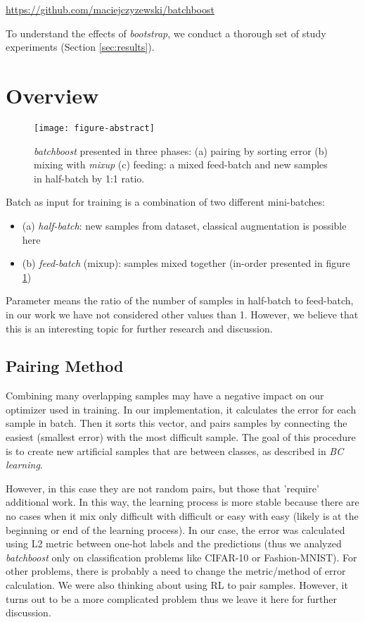 \documentclass{article}
\begin{document}
\begin{center}
\url{https://github.com/maciejczyzewski/batchboost}
\end{center}

To understand the effects of \emph{bootstrap}, we conduct a
thorough set of study experiments (Section \ref{sec:results}).

\section{Overview}
\label{sec:overview}

\begin{figure}[H]
  \centering
  \texttt{[image: figure-abstract]}
  \caption{\emph{batchboost} presented in three phases: (a) pairing by sorting
	  error (b) mixing with \emph{mixup} (c) feeding: a mixed feed-batch and new
	  samples in half-batch by 1:1 ratio.}
  \label{fig:abstract}
\end{figure}

Batch as input for training is a combination of two different mini-batches:
\begin{itemize}
\item (a) \emph{half-batch}: new samples from dataset, classical augmentation is possible here
\item (b) \emph{feed-batch} (mixup): samples mixed together (in-order presented in
figure \ref{fig:abstract})
\end{itemize}

Parameter  means the ratio of the number of samples in half-batch to
feed-batch, in our work we have not considered other values than 1. However, we believe that this is an interesting topic for further research and discussion.

\subsection{Pairing Method}
\label{sec:pairing}

Combining many overlapping samples may have a negative impact on our optimizer
used in training.  In our implementation, it calculates the error for each
sample in batch.  Then it sorts this vector, and pairs samples by connecting the
easiest (smallest error) with the most difficult sample.  The goal of this
procedure is to create new artificial samples that are between classes, as
described in \emph{BC learning}.

However, in this case they are not random pairs, but those that 'require'
additional work. In this way, the learning process is more stable because there
are no cases when it mix only difficult with difficult or easy with easy (likely
is at the beginning or end of the learning process).
In our case, the error was calculated using L2 metric between one-hot labels and
the predictions (thus we analyzed \emph{batchboost} only on classification
problems like CIFAR-10\cite{krizhevsky2009learning} or
Fashion-MNIST\cite{xiao2017}). For other problems, there is probably
a need to change the metric/method of error calculation.
We were also thinking about using RL to pair samples. However, it turns out to
be a more complicated problem thus we leave it here for further discussion.
\end{document}
